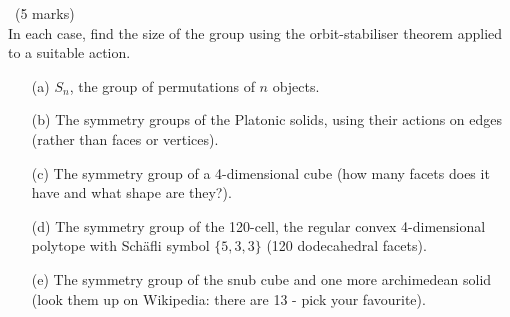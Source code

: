 \documentclass[12pt]{article}
\begin{document}
\begin{question}\ (5 marks)\\
  In each case, find the size of the group using the orbit-stabiliser theorem applied to a suitable action.
  \begin{enumerate}
  \item[(a)] $S_n$, the group of permutations of $n$ objects.
  \item[(b)] The symmetry groups of the Platonic solids, using their actions on edges (rather than faces or vertices).
  \item[(c)] The symmetry group of a 4-dimensional cube (how many facets does it have and what shape are they?).
  \item[(d)] The symmetry group of the 120-cell, the regular convex 4-dimensional polytope with Sch\"afli symbol $\{5,3,3\}$ (120 dodecahedral facets).
  \item[(e)] The symmetry group of the snub cube and one more archimedean solid (look them up on Wikipedia: there are 13 - pick your favourite).
  \end{enumerate}
\end{question}
\iffalse
\end{document}
